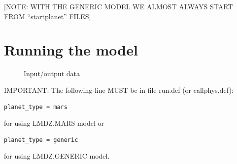 [NOTE: WITH THE GENERIC MODEL WE ALMOST ALWAYS START FROM ``startplanet'' FILES]
\section{Running the model}
\begin{figure}
\centerline{}
\caption{Input/output data}
\label{fig:inout}
\end{figure}

IMPORTANT: The following line MUST be in file run.def (or callphys.def): 
\begin{verbatim}
planet_type = mars
\end{verbatim}
for using LMDZ.MARS model or
\begin{verbatim}
planet_type = generic
\end{verbatim}
for using LMDZ.GENERIC model.

